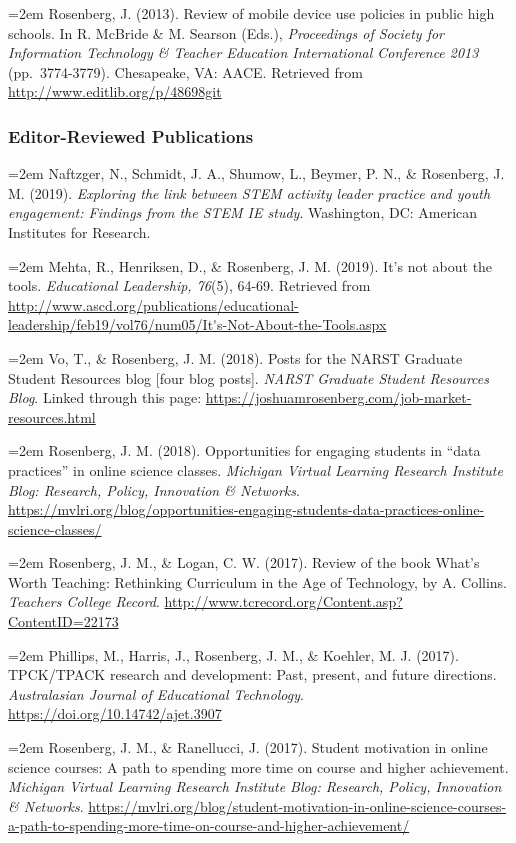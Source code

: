 \documentclass[14,]{article}
\begin{document}
\hangindent=2em Rosenberg, J. (2013). Review of mobile device use
policies in public high schools. In R. McBride \& M. Searson (Eds.),
\emph{Proceedings of Society for Information Technology \& Teacher
Education International Conference 2013} (pp.~3774-3779). Chesapeake,
VA: AACE. Retrieved from \url{http://www.editlib.org/p/48698git}

\hypertarget{editor-reviewed-publications}{%
\subsubsection{Editor-Reviewed
Publications}\label{editor-reviewed-publications}}

\hangindent=2em Naftzger, N., Schmidt, J. A., Shumow, L., Beymer, P. N.,
\& Rosenberg, J. M. (2019). \emph{Exploring the link between STEM
activity leader practice and youth engagement: Findings from the STEM IE
study}. Washington, DC: American Institutes for Research.

\hangindent=2em Mehta, R., Henriksen, D., \& Rosenberg, J. M. (2019).
It's not about the tools. \emph{Educational Leadership, 76}(5), 64-69.
Retrieved from
\url{http://www.ascd.org/publications/educational-leadership/feb19/vol76/num05/It's-Not-About-the-Tools.aspx}

\hangindent=2em Vo, T., \& Rosenberg, J. M. (2018). Posts for the NARST
Graduate Student Resources blog {[}four blog posts{]}. \emph{NARST
Graduate Student Resources Blog}. Linked through this page:
\url{https://joshuamrosenberg.com/job-market-resources.html}

\hangindent=2em Rosenberg, J. M. (2018). Opportunities for engaging
students in ``data practices'' in online science classes. \emph{Michigan
Virtual Learning Research Institute Blog: Research, Policy, Innovation
\& Networks}.
\url{https://mvlri.org/blog/opportunities-engaging-students-data-practices-online-science-classes/}

\hangindent=2em Rosenberg, J. M., \& Logan, C. W. (2017). Review of the
book What's Worth Teaching: Rethinking Curriculum in the Age of
Technology, by A. Collins. \emph{Teachers College Record}.
\url{http://www.tcrecord.org/Content.asp?ContentID=22173}

\hangindent=2em Phillips, M., Harris, J., Rosenberg, J. M., \& Koehler,
M. J. (2017). TPCK/TPACK research and development: Past, present, and
future directions. \emph{Australasian Journal of Educational
Technology}. \url{https://doi.org/10.14742/ajet.3907}

\hangindent=2em Rosenberg, J. M., \& Ranellucci, J. (2017). Student
motivation in online science courses: A path to spending more time on
course and higher achievement. \emph{Michigan Virtual Learning Research
Institute Blog: Research, Policy, Innovation \& Networks}.
\url{https://mvlri.org/blog/student-motivation-in-online-science-courses-a-path-to-spending-more-time-on-course-and-higher-achievement/}
\end{document}
